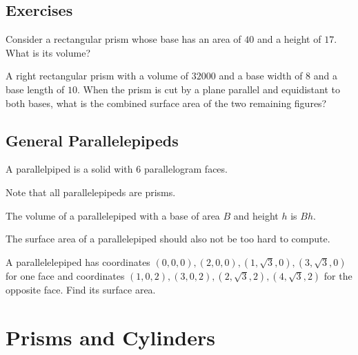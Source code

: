 \documentclass[mast]{lucky}
\begin{document}
\subsection{Exercises}


\begin{exer}
Consider a rectangular prism whose base has an area of $40$ and a height of $17.$ What is its volume?
\end{exer}
\begin{exer}
A right rectangular prism with a volume of $32000$ and a base width of $8$ and a base length of $10.$ When the prism is cut by a plane parallel and equidistant to both bases, what is the combined surface area of the two remaining figures?
\end{exer}

\subsection{General Parallelepipeds}

\begin{defi}[Parallelepipeds]
A parallelpiped is a solid with $6$ parallelogram faces.
\end{defi}
Note that all parallelepipeds are prisms.

\begin{theo}
The volume of a parallelepiped with a base of area $B$ and height $h$ is $Bh.$
\end{theo}

\begin{center}
\end{center}
The surface area of a parallelepiped should also not be too hard to compute.


\begin{exer}
A parallelelepiped has coordinates $(0,0,0),(2,0,0),(1,\sqrt{3},0),(3,\sqrt{3},0)$ for one face and coordinates $(1,0,2),(3,0,2),(2,\sqrt{3},2),(4,\sqrt{3},2)$ for the opposite face. Find its surface area.
\end{exer}


\section{Prisms and Cylinders}
\end{document}
